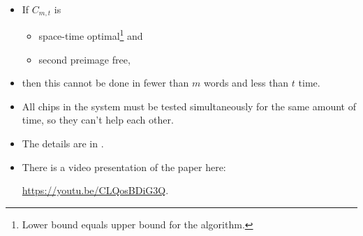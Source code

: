 \begin{frame}
  \begin{remark}
    \begin{itemize}
      \item If \(C_{m,t}\) is
        \begin{itemize}
          \item space-time optimal\footnote{%
              Lower bound equals upper bound for the algorithm.
            } and
          \item second preimage free,
        \end{itemize}
      \item then this cannot be done in fewer than \(m\) words and less than 
        \(t\) time.
      \item All chips in the system must be tested simultaneously for the same 
        amount of time, so they can't help each other.
    \end{itemize}
  \end{remark}
\end{frame}

\begin{frame}
  \begin{remark}
    \begin{itemize}
      \item The details are in .
      \item There is a video presentation of the paper here:
        \begin{center}
          \url{https://youtu.be/CLQosBDiG3Q}.
        \end{center}
    \end{itemize}
  \end{remark}
\end{frame}
